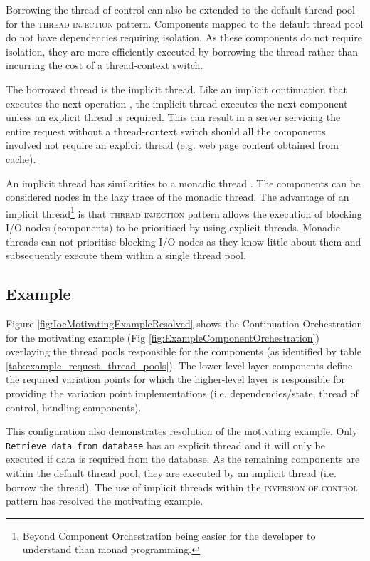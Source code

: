 \documentclass[prodmode]{style/acmlarge}
\begin{document}
Borrowing the thread of control can also be extended to the default thread pool
for the \textsc{thread injection} pattern.  Components mapped to the default
thread pool do not have dependencies requiring isolation.  As these components
do not require isolation, they are more efficiently executed by borrowing the
thread rather than incurring the cost of a thread-context switch.

The borrowed thread is the implicit thread.  Like an implicit continuation that
executes the next operation \cite{continuations}, the implicit thread executes
the next component unless an explicit thread is required.  This can result in
a server servicing the entire request without a thread-context switch
should all the components involved not require an explicit thread
(e.g. web page content obtained from cache).

An implicit thread has similarities to a monadic thread \cite{monadic-thread}.
The components can be considered nodes in the lazy trace of the monadic thread.
The advantage of an implicit thread\footnote{Beyond Component Orchestration
being easier for the developer to understand than monad programming.} is that
\textsc{thread injection} pattern allows the execution of blocking I/O nodes
(components) to be prioritised by using explicit threads.  Monadic threads can
not prioritise blocking I/O nodes as they know little about them and
subsequently execute them within a single thread pool.


\subsection{Example}

Figure \ref{fig:IocMotivatingExampleResolved} shows the Continuation
Orchestration for the motivating example (Fig
\ref{fig:ExampleComponentOrchestration}) overlaying the thread pools responsible
for the components (as identified by table
\ref{tab:example_request_thread_pools}).  The lower-level layer components
define the required variation points for which the higher-level layer is
responsible for providing the variation point implementations (i.e.
dependencies/state, thread of control, handling components).

This configuration also demonstrates resolution of the motivating example.  Only
\texttt{Retrieve data from data\-base} has an explicit thread and it will only be
executed if data is required from the database.  As the remaining components are
within the default thread pool, they are executed by an implicit thread (i.e.
borrow the thread).  The use of implicit threads within the \textsc{inversion of
control} pattern has resolved the motivating example.
\end{document}

